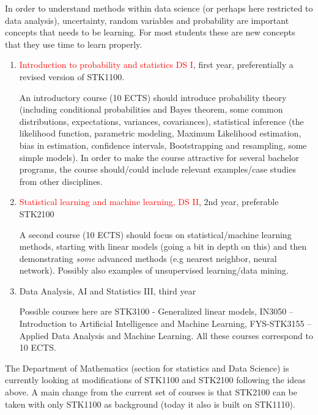 \documentclass[oneside,final,10pt]{article}
\begin{document}
 In order to understand methods within data science (or perhaps here restricted to data analysis), uncertainty, random variables and probability are important concepts that needs to be learning. For most students these are new concepts that they use time to learn properly. 
\begin{enumerate}
    \item \textcolor{red}{Introduction to probability and statistics DS I}, first year, preferentially a revised version of STK1100.
    
    An introductory course (10 ECTS) should introduce probability theory (including conditional probabilities and Bayes theorem, some common distributions, expectations, variances, covariances), statistical inference (the likelihood function, parametric modeling, Maximum Likelihood estimation, bias in estimation, confidence intervals, Bootstrapping and resampling, some simple models). In order to make the course attractive for several bachelor programs, the course should/could include relevant examples/case studies from other disciplines.
    
    \item \textcolor{red}{Statistical learning and machine learning, DS II}, 2nd year, preferable STK2100
    
    A second course (10 ECTS) should focus on statistical/machine learning methods, starting with linear models (going a bit in depth on this) and then demonstrating \emph{some} advanced methods (e.g nearest neighbor, neural network). Possibly also examples of unsupervised learning/data mining.

    \item Data Analysis, AI and Statistics III, third year
    
    Possible courses here are STK3100 - Generalized linear models,  
IN3050 – Introduction to Artificial Intelligence and Machine Learning, FYS-STK3155 – Applied Data Analysis and Machine Learning. All these courses correspond to 10 ECTS.
\end{enumerate}


The Department of Mathematics
(section for statistics and Data Science) is currently looking at modifications of STK1100 and STK2100 following the ideas above. A main change from the current set of courses is that STK2100 can be taken with only STK1100 as background (today it also is built on STK1110).
\end{document}
